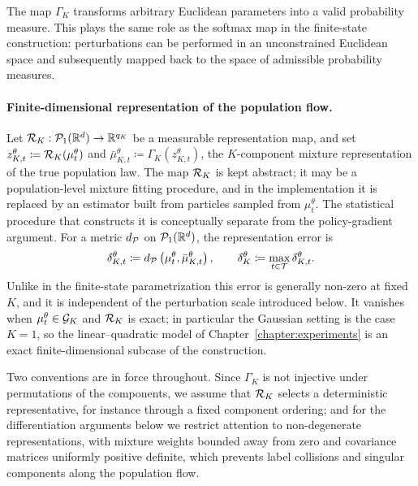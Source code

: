 The map $\Gamma_K$ transforms arbitrary Euclidean parameters into a valid probability measure. This plays the same role as the softmax map in the finite-state construction: perturbations can be performed in an unconstrained Euclidean space and subsequently mapped back to the space of admissible probability measures.

\paragraph{Finite-dimensional representation of the population flow.}
Let ${\cal R}_K:{\cal P}_1(\mathbb{R}^d)\to\mathbb{R}^{q_K}$ be a measurable representation map, and set $z_{K,t}^\theta\coloneqq{\cal R}_K(\mu_t^\theta)$ and $\bar\mu_{K,t}^\theta\coloneqq\Gamma_K(z_{K,t}^\theta)$, the $K$-component mixture representation of the true population law. The map ${\cal R}_K$ is kept abstract; it may be a population-level mixture fitting procedure, and in the implementation it is replaced by an estimator built from particles sampled from $\mu_t^\theta$. The statistical procedure that constructs it is conceptually separate from the policy-gradient argument. For a metric $d_{\cal P}$ on ${\cal P}_1(\mathbb{R}^d)$, the representation error is
\begin{align}
    \label{eq:gmm-representation-error}
    \delta_{K,t}^\theta\coloneqq d_{\cal P} \left( \mu_t^\theta,\bar\mu_{K,t}^\theta\right),\qquad \delta_K^\theta\coloneqq\max_{t\in{\cal T}}\delta_{K,t}^\theta.
\end{align}
Unlike in the finite-state parametrization this error is generally non-zero at fixed $K$, and it is independent of the perturbation scale introduced below. It vanishes when $\mu_t^\theta\in{\cal G}_K$ and ${\cal R}_K$ is exact; in particular the Gaussian setting is the case $K=1$, so the linear--quadratic model of Chapter~\ref{chapter:experiments} is an exact finite-dimensional subcase of the construction.

Two conventions are in force throughout. Since $\Gamma_K$ is not injective under permutations of the components, we assume that ${\cal R}_K$ selects a deterministic representative, for instance through a fixed component ordering; and for the differentiation arguments below we restrict attention to non-degenerate representations, with mixture weights bounded away from zero and covariance matrices uniformly positive definite, which prevents label collisions and singular components along the population flow.

